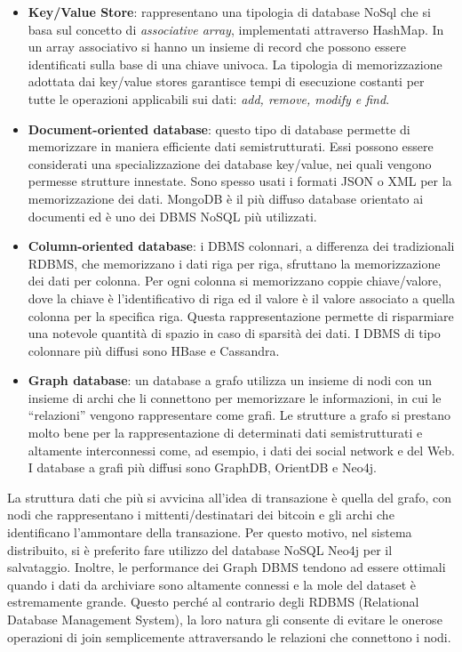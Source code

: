 \begin{itemize}
\item  \textbf{Key/Value Store}: rappresentano una tipologia di database NoSql che si basa sul concetto di \textit{associative array}, implementati attraverso HashMap. In un array associativo si hanno un insieme di record che possono essere identificati sulla base di una chiave univoca. La tipologia di memorizzazione adottata dai key/value stores garantisce tempi di esecuzione costanti per tutte le operazioni applicabili sui dati: \textit{add, remove, modify e find}.
\item  \textbf{Document-oriented database}: questo tipo di database permette di memorizzare in maniera efficiente dati semistrutturati. Essi possono essere considerati una specializzazione dei database key/value, nei quali vengono permesse strutture innestate. Sono spesso usati i formati JSON o XML per la memorizzazione dei dati. MongoDB è il più diffuso database orientato ai documenti ed è uno dei DBMS NoSQL più utilizzati.
\item  \textbf{Column-oriented database}: i DBMS colonnari, a differenza dei tradizionali RDBMS, che memorizzano i dati riga per riga, sfruttano la memorizzazione dei dati per colonna. Per ogni colonna si memorizzano coppie chiave/valore, dove la chiave è l'identificativo di riga ed il valore è il valore associato a quella colonna per la specifica riga. Questa rappresentazione permette di risparmiare una notevole quantità di spazio in caso di sparsità dei dati.
I DBMS di tipo colonnare più diffusi sono HBase e Cassandra.
\item  \textbf{Graph database}: un database a grafo utilizza un insieme di nodi con un insieme di archi che li connettono per memorizzare le informazioni, in cui le “relazioni” vengono rappresentare come grafi. Le strutture a grafo si prestano molto bene per la rappresentazione di determinati dati semistrutturati e altamente interconnessi come, ad esempio, i dati dei social network e del Web. I database a grafi più diffusi sono GraphDB, OrientDB e Neo4j.
\end{itemize}
La struttura dati che più si avvicina all'idea di transazione è quella del grafo, con nodi che rappresentano i mittenti/destinatari dei bitcoin e gli archi che identificano l'ammontare della transazione. Per questo motivo, nel sistema distribuito, si è preferito fare utilizzo del database NoSQL Neo4j per il salvataggio. Inoltre, le performance dei Graph DBMS tendono ad essere ottimali quando i dati da archiviare sono altamente connessi e la mole del dataset è estremamente grande. Questo perché al contrario degli RDBMS (Relational Database Management System), la loro natura gli consente di evitare le onerose operazioni di join semplicemente attraversando le relazioni che connettono i nodi.
